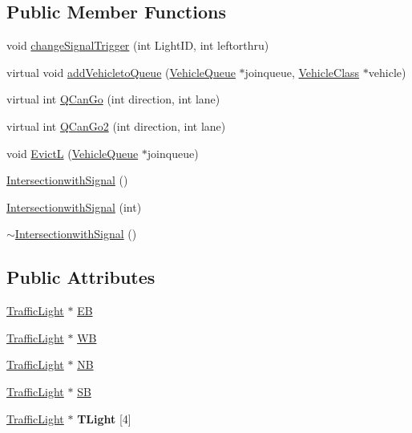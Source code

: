 \subsection*{Public Member Functions}
\begin{DoxyCompactItemize}
\item 
void \hyperlink{class_intersectionwith_signal_a78fbf7f154af7d788c0543b526c7d326}{change\-Signal\-Trigger} (int Light\-I\-D, int leftorthru)
\item 
virtual void \hyperlink{class_intersectionwith_signal_aa918c9a3033c16fac6bfa0e996677670}{add\-Vehicleto\-Queue} (\hyperlink{class_vehicle_queue}{Vehicle\-Queue} $\ast$joinqueue, \hyperlink{class_vehicle_class}{Vehicle\-Class} $\ast$vehicle)
\item 
virtual int \hyperlink{class_intersectionwith_signal_a3b2a6f1e258fcd15828ffb7e9e9881b3}{Q\-Can\-Go} (int direction, int lane)
\item 
virtual int \hyperlink{class_intersectionwith_signal_ab0fcf7dc880fef1175ce0a71c969875f}{Q\-Can\-Go2} (int direction, int lane)
\item 
void \hyperlink{class_intersectionwith_signal_ad0d48a37799feebd59959014adb042ee}{Evict\-L} (\hyperlink{class_vehicle_queue}{Vehicle\-Queue} $\ast$joinqueue)
\item 
\hyperlink{class_intersectionwith_signal_a2895da2acf740a52a4f8dd0673d3f46e}{Intersectionwith\-Signal} ()
\item 
\hyperlink{class_intersectionwith_signal_ab5eccdd602e1d9c0f6d39b5be79173d1}{Intersectionwith\-Signal} (int)
\item 
\hyperlink{class_intersectionwith_signal_a0baf29a021f4df049ad1ececeb3c1b11}{$\sim$\-Intersectionwith\-Signal} ()
\end{DoxyCompactItemize}
\subsection*{Public Attributes}
\begin{DoxyCompactItemize}
\item 
\hyperlink{class_traffic_light}{Traffic\-Light} $\ast$ \hyperlink{class_intersectionwith_signal_a8a57308329169b7c05acdeabfaa74206}{E\-B}
\item 
\hyperlink{class_traffic_light}{Traffic\-Light} $\ast$ \hyperlink{class_intersectionwith_signal_a5f321e72c10bb5a4ebeb6d314135fdbb}{W\-B}
\item 
\hyperlink{class_traffic_light}{Traffic\-Light} $\ast$ \hyperlink{class_intersectionwith_signal_af548458cb3fbe82d25a13fd9295406f7}{N\-B}
\item 
\hyperlink{class_traffic_light}{Traffic\-Light} $\ast$ \hyperlink{class_intersectionwith_signal_a19a6f5316f7d0ec4c08e6f80126b3e6c}{S\-B}
\item 
\hypertarget{class_intersectionwith_signal_a2c5e8c7432419eac922f8efa01a2f487}{\hyperlink{class_traffic_light}{Traffic\-Light} $\ast$ {\bfseries T\-Light} \mbox{[}4\mbox{]}}\label{class_intersectionwith_signal_a2c5e8c7432419eac922f8efa01a2f487}

\end{DoxyCompactItemize}
